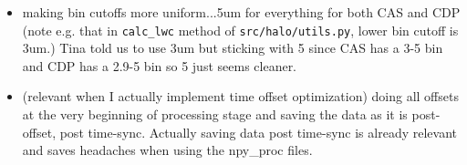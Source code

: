 \documentclass{article}
\begin{document}
\begin{itemize}
	\begin{itemize}
		\item making bin cutoffs more uniform...5um for everything for both CAS and CDP (note e.g. that in \texttt{calc\_lwc} method of \texttt{src/halo/utils.py}, lower bin cutoff is 3um.) Tina told us to use 3um but sticking with 5 since CAS has a 3-5 bin and CDP has a 2.9-5 bin so 5 just seems cleaner.
		\item (relevant when I actually implement time offset optimization) doing all offsets at the very beginning of processing stage and saving the data as it is post-offset, post time-sync. Actually saving data post time-sync is already relevant and saves headaches when using the npy\_proc files. 
	\end{itemize}
\end{itemize}
\end{document}

